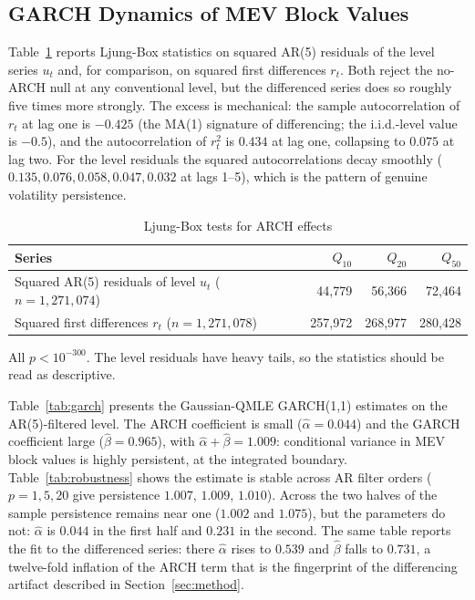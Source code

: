 \documentclass[11pt]{article}
\begin{document}
\subsection{GARCH Dynamics of MEV Block Values}
\label{sec:garch}

Table~\ref{tab:ljungbox} reports Ljung-Box statistics on squared AR(5)
residuals of the level series $u_t$ and, for comparison, on squared
first differences $r_t$. Both reject the no-ARCH null at any conventional level,
but the differenced series does so roughly five times more strongly. The
excess is mechanical: the sample autocorrelation of $r_t$ at lag one is
$-0.425$ (the MA(1) signature of differencing; the i.i.d.-level value is
$-0.5$), and the autocorrelation of $r_t^2$ is $0.434$ at lag one, collapsing
to $0.075$ at lag two. For the level residuals the squared autocorrelations
decay smoothly ($0.135, 0.076, 0.058, 0.047, 0.032$ at lags 1--5), which is the
pattern of genuine volatility persistence.

\begin{table}[!htbp]
\centering
\caption{Ljung-Box tests for ARCH effects}
\label{tab:ljungbox}
\begin{tabular}{lrrr}
\toprule
Series & $Q_{10}$ & $Q_{20}$ & $Q_{50}$ \\
\midrule
Squared AR(5) residuals of level $u_t$ ($n = 1{,}271{,}074$) & 44,779 & 56,366 & 72,464 \\
Squared first differences $r_t$ ($n = 1{,}271{,}078$) & 257,972 & 268,977 & 280,428 \\
\bottomrule
\end{tabular}
\smallskip
\footnotesize All $p < 10^{-300}$. The level residuals have heavy tails, so the statistics should be read as descriptive.
\end{table}

Table~\ref{tab:garch} presents the Gaussian-QMLE GARCH(1,1) estimates on the
AR(5)-filtered level. The ARCH coefficient is small ($\hat\alpha = 0.044$) and
the GARCH coefficient large ($\hat\beta = 0.965$), with
$\hat\alpha + \hat\beta = 1.009$: conditional variance in MEV block values is
highly persistent, at the integrated boundary. Table~\ref{tab:robustness}
shows the estimate is stable across AR filter orders ($p = 1, 5, 20$ give
persistence $1.007$, $1.009$, $1.010$). Across the two halves of the sample
persistence remains near one ($1.002$ and $1.075$), but the parameters do
not: $\hat\alpha$ is $0.044$ in the first half and $0.231$ in the second. The same table reports the fit to the differenced
series: there $\hat\alpha$ rises to $0.539$ and $\hat\beta$ falls to $0.731$,
a twelve-fold inflation of the ARCH term that is the fingerprint of the
differencing artifact described in Section~\ref{sec:method}.
\end{document}
